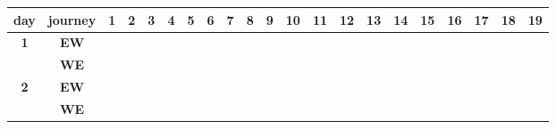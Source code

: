 \documentclass[a4,11pt,twocolumn]{article}
\begin{document}
\begin{table}[h]
\centering

\begin{tabular}{|c|c|*{19}{l|}}
\hline
\multicolumn{1}{|l|}{\textbf{day}} & \textbf{journey}   & 1                        & 2                        & 3                        & 4                        & 5                        & 6                        & 7                        & 8                        & 9                        & 10                       & 11                       & 12                       & 13                       & 14                       & 15                       & 16                       & 17                       & 18                       & 19                       \\ \hline
\multirow{2}{*}{\textbf{1}} & \textbf{EW} & \cellcolor[HTML]{F56B00} & \cellcolor[HTML]{F56B00} & \cellcolor[HTML]{5AB25A} & \cellcolor[HTML]{FFCB2F} & \cellcolor[HTML]{FFCB2F} & \cellcolor[HTML]{F56B00} & \cellcolor[HTML]{FFCB2F} & \cellcolor[HTML]{5AB25A} & \cellcolor[HTML]{F56B00} & \cellcolor[HTML]{5AB25A} & \cellcolor[HTML]{FFCB2F} & \cellcolor[HTML]{F56B00} & \cellcolor[HTML]{FFCB2F} & \cellcolor[HTML]{FFCB2F} & \cellcolor[HTML]{F56B00} & \cellcolor[HTML]{9A0000} & \cellcolor[HTML]{FFCB2F} & \cellcolor[HTML]{F56B00} & \cellcolor[HTML]{5AB25A} \\ 
\cline{2-20} 
 & \textbf{WE} & \cellcolor[HTML]{F56B00} & \cellcolor[HTML]{F56B00} &                          & \cellcolor[HTML]{FFCB2F} & \cellcolor[HTML]{FFCB2F} & \cellcolor[HTML]{FFCB2F} & \cellcolor[HTML]{FFCB2F} & \cellcolor[HTML]{FFCB2F} & \cellcolor[HTML]{F56B00} & \cellcolor[HTML]{F56B00} & \cellcolor[HTML]{FFCB2F} & \cellcolor[HTML]{F56B00} & \cellcolor[HTML]{FFCB2F} & \cellcolor[HTML]{FFCB2F} & \cellcolor[HTML]{9A0000} & \cellcolor[HTML]{9A0000} & \cellcolor[HTML]{FFCB2F} & \cellcolor[HTML]{F56B00} &  \\ 
 \hline
\multirow{2}{*}{\textbf{2}} & \textbf{EW} & \cellcolor[HTML]{F56B00} & \cellcolor[HTML]{F56B00} & \cellcolor[HTML]{5AB25A} & \cellcolor[HTML]{FFCB2F} & \cellcolor[HTML]{FFCB2F} & \cellcolor[HTML]{FFCB2F} & \cellcolor[HTML]{FFCB2F} & \cellcolor[HTML]{FFCB2F} & \cellcolor[HTML]{F56B00} & \cellcolor[HTML]{F56B00} & \cellcolor[HTML]{FFCB2F} & \cellcolor[HTML]{F56B00} & \cellcolor[HTML]{FFCB2F} & \cellcolor[HTML]{F56B00} & \cellcolor[HTML]{9A0000} & \cellcolor[HTML]{9A0000} & \cellcolor[HTML]{FFCB2F} & \cellcolor[HTML]{F56B00} & \cellcolor[HTML]{5AB25A} \\ 
\cline{2-20} 
 & \textbf{WE} & \cellcolor[HTML]{F56B00} & \cellcolor[HTML]{F56B00} & \cellcolor[HTML]{5AB25A} & \cellcolor[HTML]{FFCB2F} & \cellcolor[HTML]{FFCB2F} & \cellcolor[HTML]{FFCB2F} & \cellcolor[HTML]{FFCB2F} & \cellcolor[HTML]{FFCB2F} & \cellcolor[HTML]{F56B00} & \cellcolor[HTML]{FFCB2F} & \cellcolor[HTML]{FFCB2F} & \cellcolor[HTML]{FFCB2F} & \cellcolor[HTML]{FFCB2F} & \cellcolor[HTML]{FFCB2F} & \cellcolor[HTML]{9A0000} & \cellcolor[HTML]{9A0000} & \cellcolor[HTML]{FFCB2F} & \cellcolor[HTML]{9A0000} & \cellcolor[HTML]{5AB25A} \\ \hline
\end{tabular}


\end{table}
\end{document}
